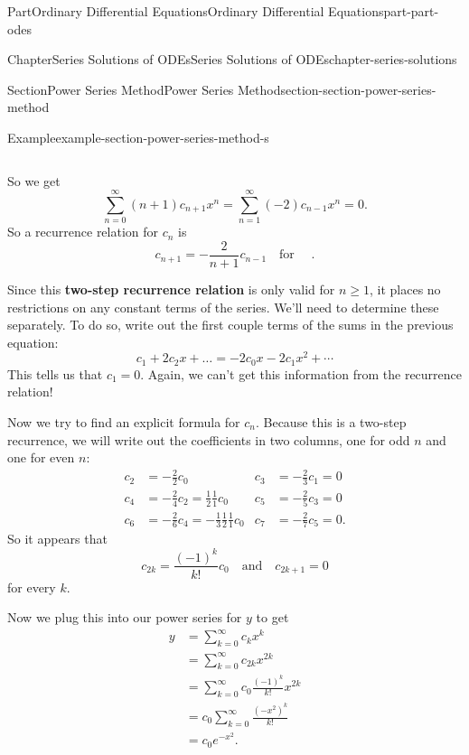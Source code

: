 \documentclass[twoside,10pt,]{book}
\newcommand{\terminology}[1]{\textbf{#1}}
\numberwithin{equation}{part}
\newcommand{\qq}[1]{\quad\text{#1}\quad}
\begin{document}
\begin{partptx}{Part}{Ordinary Differential Equations}{}{Ordinary Differential Equations}{}{}{part-part-odes}
\begin{chapterptx}{Chapter}{Series Solutions of ODEs}{}{Series Solutions of ODEs}{}{}{chapter-series-solutions}
\begin{sectionptx}{Section}{Power Series Method}{}{Power Series Method}{}{}{section-section-power-series-method}
\begin{example}{Example}{}{example-section-power-series-method-s}
\begin{center}
{\begin{tabular}{lll}
\end{tabular}
}%
\end{center}%
So we get%
\begin{equation*}
\sum_{n=0}^{\infty}(n+1)c_{n+1}x^{n} = \sum_{n=1}^{\infty}(-2)c_{n-1}x^{n} = 0.
\end{equation*}
So a recurrence relation for \(c_{n}\) is%
\begin{equation*}
c_{n+1} = -\frac{2}{n+1}c_{n-1}\qq{for }.
\end{equation*}
%
\par
Since this \terminology{two-step recurrence relation} is only valid for \(n\geq1\), it places no restrictions on any constant terms of the series. We'll need to determine these separately. To do so, write out the first couple terms of the sums in the previous equation:%
\begin{equation*}
c_{1}+2c_{2}x+\dots = -2c_{0}x -2c_{1}x^{2}+\cdots
\end{equation*}
This tells us that \(c_{1} = 0\). Again, we can't get this information from the recurrence relation!%
\par
Now we try to find an explicit formula for \(c_{n}\). Because this is a two-step recurrence, we will write out the coefficients in two columns, one for odd \(n\) and one for even \(n\):%
\begin{align*}
c_{2} &= -\frac{2}{2}c_{0} & c_{3} &= -\frac{2}{3}c_{1} = 0\\
c_{4} &= -\frac{2}{4}c_{2} = \frac{1}{2}\frac{1}{1}c_{0} & c_{5} &= -\frac{2}{5}c_{3} = 0\\
c_{6} &= -\frac{2}{6}c_{4} = -\frac{1}{3}\frac{1}{2}\frac{1}{1}c_{0} & c_{7} &= -\frac{2}{7}c_{5} = 0\text{.}
\end{align*}
So it appears that%
\begin{equation*}
c_{2k} = \frac{(-1)^{k}}{k!}c_{0}\qq{and}c_{2k+1} = 0
\end{equation*}
for every \(k\).%
\par
Now we plug this into our power series for \(y\) to get%
\begin{align*}
y &= \sum_{k=0}^{\infty}c_{k}x^{k}\\
&= \sum_{k=0}^{\infty}c_{2k}x^{2k}\\
&= \sum_{k=0}^{\infty}c_{0}\frac{(-1)^{k}}{k!}x^{2k}\\
&= c_{0}\sum_{k=0}^{\infty}\frac{(-x^{2})^{k}}{k!}\\
&= c_{0}e^{-x^{2}}\text{.}
\end{align*}
%
\end{example}

\end{sectionptx}
\end{chapterptx}
\end{partptx}
\end{document}
